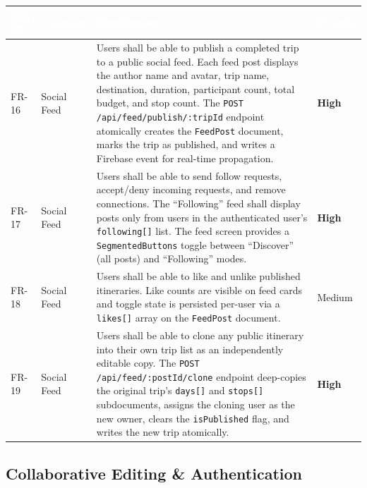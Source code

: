 \documentclass[12pt, a4paper]{article}
\newcommand{\reqid}[1]{\textsc{\small #1}}
\newcommand{\high}{\textbf{High}}
\newcommand{\medium}{Medium}
\newcommand{\thcell}[1]{\textcolor{white}{\textbf{\small #1}}}
\begin{document}
\vspace{0.4em}
\begin{longtable}{C{1.6cm} C{2.0cm} L{8.2cm} C{1.8cm}}
\toprule
{}
\thcell{Req ID} & \thcell{Category} & \thcell{Requirement} & \thcell{Priority} \\
\midrule
\endhead
\bottomrule
\endfoot

\reqid{FR-16} & Social Feed &
Users shall be able to publish a completed trip to a public social feed. Each feed post displays the author name and avatar, trip name, destination, duration, participant count, total budget, and stop count. The \texttt{POST /api/feed/publish/:tripId} endpoint atomically creates the \texttt{FeedPost} document, marks the trip as published, and writes a Firebase event for real-time propagation. &
\high \\

\reqid{FR-17} & Social Feed &
Users shall be able to send follow requests, accept/deny incoming requests, and remove connections. The ``Following'' feed shall display posts only from users in the authenticated user's \texttt{following[]} list. The feed screen provides a \texttt{SegmentedButtons} toggle between ``Discover'' (all posts) and ``Following'' modes. &
\high \\

\reqid{FR-18} & Social Feed &
Users shall be able to like and unlike published itineraries. Like counts are visible on feed cards and toggle state is persisted per-user via a \texttt{likes[]} array on the \texttt{FeedPost} document. &
\medium \\

\reqid{FR-19} & Social Feed &
Users shall be able to clone any public itinerary into their own trip list as an independently editable copy. The \texttt{POST /api/feed/:postId/clone} endpoint deep-copies the original trip's \texttt{days[]} and \texttt{stops[]} subdocuments, assigns the cloning user as the new owner, clears the \texttt{isPublished} flag, and writes the new trip atomically. &
\high \\

\end{longtable}

\subsection{Collaborative Editing \& Authentication}
\end{document}
